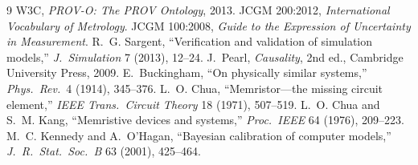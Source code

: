 \documentclass[11pt]{amsart}
\theoremstyle{definition}
\theoremstyle{remark}
\begin{document}
\begin{thebibliography}{9}
 W3C, \emph{PROV-O: The PROV Ontology}, 2013.
 JCGM 200:2012, \emph{International Vocabulary of Metrology}.
 JCGM 100:2008, \emph{Guide to the Expression of Uncertainty in Measurement}.
 R.~G. Sargent, ``Verification and validation of simulation models,'' \emph{J.\ Simulation} 7 (2013), 12--24.
 J.~Pearl, \emph{Causality}, 2nd ed., Cambridge University Press, 2009.
 E.~Buckingham, ``On physically similar systems,'' \emph{Phys.\ Rev.}\ 4 (1914), 345--376.
 L.~O. Chua, ``Memristor---the missing circuit element,'' \emph{IEEE Trans.\ Circuit Theory} 18 (1971), 507--519.
 L.~O. Chua and S.~M. Kang, ``Memristive devices and systems,'' \emph{Proc.\ IEEE} 64 (1976), 209--223.
 M.~C. Kennedy and A.~O'Hagan, ``Bayesian calibration of computer models,'' \emph{J.\ R.\ Stat.\ Soc.\ B} 63 (2001), 425--464.
\end{thebibliography}
\end{document}

